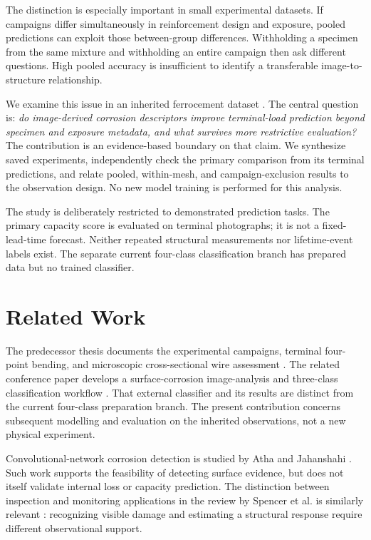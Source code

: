 \documentclass[conference]{IEEEtran}
\begin{document}
The distinction is especially important in small experimental datasets. If campaigns differ simultaneously in reinforcement design and exposure, pooled predictions can exploit those between-group differences. Withholding a specimen from the same mixture and withholding an entire campaign then ask different questions. High pooled accuracy is insufficient to identify a transferable image-to-structure relationship.

We examine this issue in an inherited ferrocement dataset \cite{hossain_thesis,artiste2025}. The central question is: \emph{do image-derived corrosion descriptors improve terminal-load prediction beyond specimen and exposure metadata, and what survives more restrictive evaluation?} The contribution is an evidence-based boundary on that claim. We synthesize saved experiments, independently check the primary comparison from its terminal predictions, and relate pooled, within-mesh, and campaign-exclusion results to the observation design. No new model training is performed for this analysis.

The study is deliberately restricted to demonstrated prediction tasks. The primary capacity score is evaluated on terminal photographs; it is not a fixed-lead-time forecast. Neither repeated structural measurements nor lifetime-event labels exist. The separate current four-class classification branch has prepared data but no trained classifier.

\section{Related Work}
The predecessor thesis documents the experimental campaigns, terminal four-point bending, and microscopic cross-sectional wire assessment \cite{hossain_thesis}. The related conference paper develops a surface-corrosion image-analysis and three-class classification workflow \cite{artiste2025}. That external classifier and its results are distinct from the current four-class preparation branch. The present contribution concerns subsequent modelling and evaluation on the inherited observations, not a new physical experiment.

Convolutional-network corrosion detection is studied by Atha and Jahanshahi \cite{atha2018}. Such work supports the feasibility of detecting surface evidence, but does not itself validate internal loss or capacity prediction. The distinction between inspection and monitoring applications in the review by Spencer et al. is similarly relevant \cite{spencer2019}: recognizing visible damage and estimating a structural response require different observational support.
\end{document}
